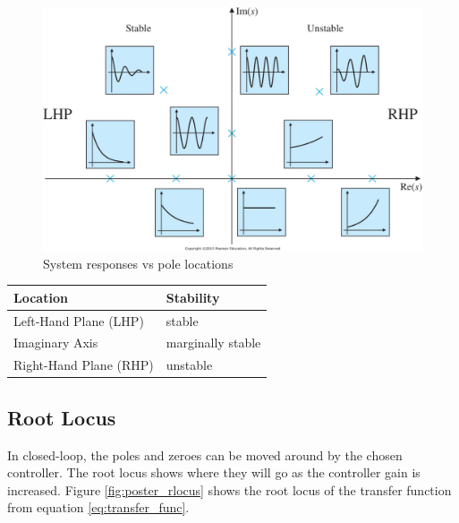 \documentclass[10pt,conference,compsoc]{IEEEtran}
\begin{document}
\begin{figure}[H]
  \includegraphics[width=\linewidth]{figs/ResponseVsPoleLocations.png}
  \caption{System responses vs pole locations \cite{bib:pole_locations}}
\end{figure}

\begin{table}[ht]
  \renewcommand{\arraystretch}{1.3}
  \centering
  \begin{tabularx}{\linewidth}{|lX|}
    \hline
    \textbf{Location} & \textbf{Stability} \\
    \hline
    Left-Hand Plane (LHP) & stable \\
    Imaginary Axis & marginally stable \\
    Right-Hand Plane (RHP) & unstable \\
    \hline
  \end{tabularx}
  \label{tab:pole_locations}
\end{table}

\subsection{Root Locus}

\noindent In closed-loop, the poles and zeroes can be moved around by the chosen
controller. The root locus shows where they will go as the controller gain is
increased. Figure \ref{fig:poster_rlocus} shows the root locus of the transfer
function from equation \ref{eq:transfer_func}.
\end{document}
